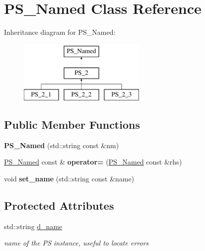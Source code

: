 \hypertarget{classPS__Named}{\section{P\-S\-\_\-\-Named Class Reference}
\label{classPS__Named}
}
Inheritance diagram for P\-S\-\_\-\-Named\-:\begin{figure}[H]
\begin{center}
\leavevmode
\includegraphics[height=3.000000cm]{classPS__Named}
\end{center}
\end{figure}
\subsection*{Public Member Functions}
\begin{DoxyCompactItemize}
\item 
\hypertarget{classPS__Named_ae9995f08b542e78ca1a9dc96805ebfdf}{{\bfseries P\-S\-\_\-\-Named} (std\-::string const \&nm)}\label{classPS__Named_ae9995f08b542e78ca1a9dc96805ebfdf}

\item 
\hypertarget{classPS__Named_a49250b5b43dce6fc026241d023d0e155}{\hyperlink{classPS__Named}{P\-S\-\_\-\-Named} const \& {\bfseries operator=} (\hyperlink{classPS__Named}{P\-S\-\_\-\-Named} const \&rhs)}\label{classPS__Named_a49250b5b43dce6fc026241d023d0e155}

\item 
\hypertarget{classPS__Named_ae072e1468a73ca31410d4cce3be6a6e9}{void {\bfseries set\-\_\-name} (std\-::string const \&name)}\label{classPS__Named_ae072e1468a73ca31410d4cce3be6a6e9}

\end{DoxyCompactItemize}
\subsection*{Protected Attributes}
\begin{DoxyCompactItemize}
\item 
\hypertarget{classPS__Named_a4c24a47ba31313b51c2eed75fa441a4a}{std\-::string \hyperlink{classPS__Named_a4c24a47ba31313b51c2eed75fa441a4a}{d\-\_\-name}}\label{classPS__Named_a4c24a47ba31313b51c2eed75fa441a4a}

\begin{DoxyCompactList}\small\item\em name of the P\-S instance, useful to locate errors \end{DoxyCompactList}\end{DoxyCompactItemize}



